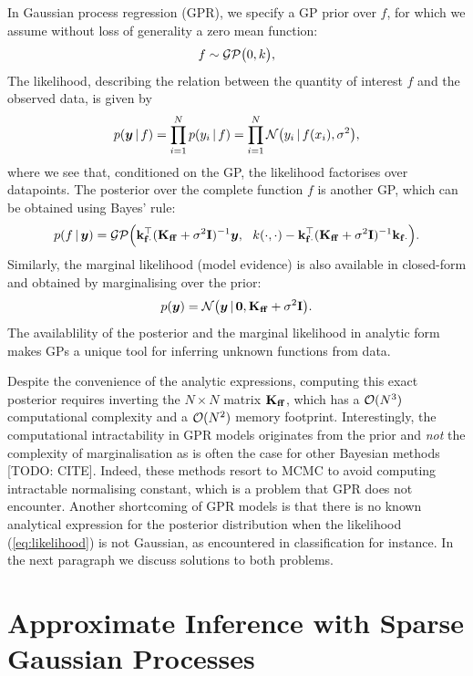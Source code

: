 In Gaussian process regression (GPR), we specify a GP prior over $f$, for which we assume without loss of generality a zero mean function:
\begin{equation}
  f \sim \mathcal{GP}\big(0, k\big),
\end{equation}
The likelihood, describing the relation between the quantity of interest $f$ and the observed data, is given by 
\begin{equation}
  \label{eq:likelihood}
  p(\vy \given f) = \prod_{i=1}^N p(y_i \given f) = \prod_{i=1}^N \NormDist{y_i \given f(x_i), \sigma^2},
\end{equation}
where we see that, conditioned on the GP, the likelihood factorises over datapoints. The posterior over the complete function $f$ is another GP, which can be obtained using Bayes' rule:
\begin{equation}
  \label{eq:f-given-y}
  p(f \,|\, \bm{y}) 
      = \mathcal{GP}\Big(\mathbf{k}_{\mathbf{f} \cdot}^\top (\mathbf{{K}}_{\mathbf{f} \mathbf{f}} + \sigma^2 \mathbf{{I}})^{-1} \bm{y},\ \ k(\cdot, \cdot) -  \mathbf{k}_{\mathbf{f} \cdot}^\top (\mathbf{{K}}_{\mathbf{f} \mathbf{f}} + \sigma^2 \mathbf{{I}})^{-1} \mathbf{k}_{\mathbf{f} \cdot}\Big).
\end{equation}
Similarly, the marginal likelihood (model evidence) is also available in closed-form and obtained by marginalising over the prior:
\begin{equation}
  \label{eq:log-marginal-likelihood}
  p(\vy) = \NormDist{\vy \given \vzero, \Kff + \sigma^2 \Eye}.
\end{equation}
The availablility of the posterior and the marginal likelihood in analytic form makes GPs a unique tool for inferring unknown functions from data. 

Despite the convenience of the analytic expressions, computing this exact posterior requires inverting the $N \times N$ matrix $\Kff$, which has a $\mathcal{O}(N^3)$ computational complexity and a $\mathcal{O}(N^2)$ memory footprint. Interestingly, the computational intractability in GPR models originates from the prior and \emph{not} the complexity of marginalisation as is often the case for other Bayesian methods [TODO: CITE]. Indeed, these methods resort to MCMC to avoid computing intractable normalising constant, which is a problem that GPR does not encounter.  Another shortcoming of GPR models is that there is no known analytical expression for the posterior distribution when the likelihood (\cref{eq:likelihood}) is not Gaussian, as encountered in classification for instance. In the next paragraph we discuss solutions to both problems.

\section{Approximate Inference with Sparse Gaussian Processes}

